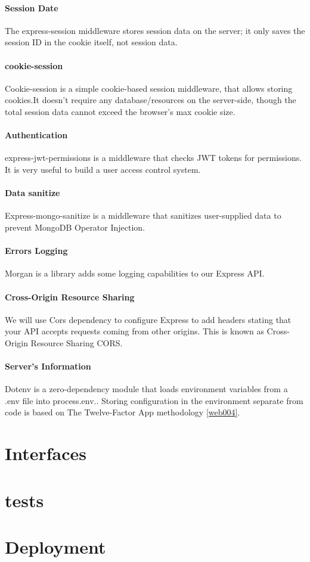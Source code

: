 \paragraph*{Session Date}
The express-session middleware stores session data on the server; it only saves the session ID in the cookie itself, not session data.

\paragraph*{cookie-session}
Cookie-session is a simple cookie-based session middleware, that allows storing cookies.It doesn't require any database/resources on the server-side, though the total session data cannot exceed the browser’s max cookie size.

\paragraph*{Authentication}
express-jwt-permissions is a middleware that checks \ac{JWT} tokens for permissions. It is very useful to build a user access control system.

\paragraph*{Data sanitize}
Express-mongo-sanitize is a middleware that sanitizes user-supplied data to prevent MongoDB Operator Injection.

\paragraph*{Errors Logging}
Morgan is a library adds some logging capabilities to our Express API.

\paragraph*{Cross-Origin Resource Sharing}
We will use Cors dependency to configure Express to add headers stating that your API accepts requests coming from other origins. This is known as Cross-Origin Resource Sharing \ac{CORS}.
\paragraph*{Server's Information}
Dotenv is a zero-dependency module that loads environment variables from a .env file into process.env.. Storing configuration in the environment separate from code is based on The Twelve-Factor App methodology \ref{web004}.



\section{Interfaces}

\section{tests}



\section{Deployment}

